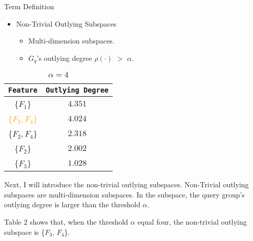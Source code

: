 \documentclass[
size=14pt,
paper=smartboard,  %
mode=present, 		%
display=slides, 	%
style=tuliplab,  	%
pauseslide,
fleqn,leqno]{powerdot}
\begin{document}
	
	\begin{slide}[toc=,bm=]{Term Definition}
		\begin{itemize}
			\item
			Non-Trivial Outlying Subspaces
			\begin{itemize}
				\item
				\smallskip
				Multi-dimension subspaces.
				
				\item
				\smallskip
				${G_q}$'s outlying degree $\rho(\cdot)$ $>$ $\alpha$.
			\end{itemize}
		\end{itemize}
		
		\begin{table}
			\setlength{\abovecaptionskip}{0pt}
			\setlength{\belowcaptionskip}{10pt}
			\centering
			\caption{$\alpha = 4$}
			
			\begin{tabular}{  c  |  c }
				\toprule
				\centering
				\texttt{Feature}  & \texttt{Outlying Degree}  \\
				\midrule
				{\{$F_1$\}}                           & $4.351$ \\
				{\textcolor{orange}{\{$F_3, F_4$\}}}  & $4.024$ \\
				{\{$F_2, F_4$\}}                      & $2.318$ \\
				{\{$F_2$\}}                           & $2.002$ \\
				{\{$F_3$\}}                           & $1.028$ \\
				\bottomrule
			\end{tabular}
		\end{table}
		
		\begin{note}
			Next,
			I will introduce the non-trivial outlying subspaces.
			Non-Trivial outlying subspaces are multi-dimension subspaces.
			In the subspace,
			the query group's outlying degree is larger than the threshold $\alpha$.
			
			Table $2$ shows that,
			when the threshold $\alpha$ equal four,
			the non-trivial outlying subspace is \{$F_3$, $F_4$\}.
		\end{note}
		
	\end{slide}
	
\end{document}
